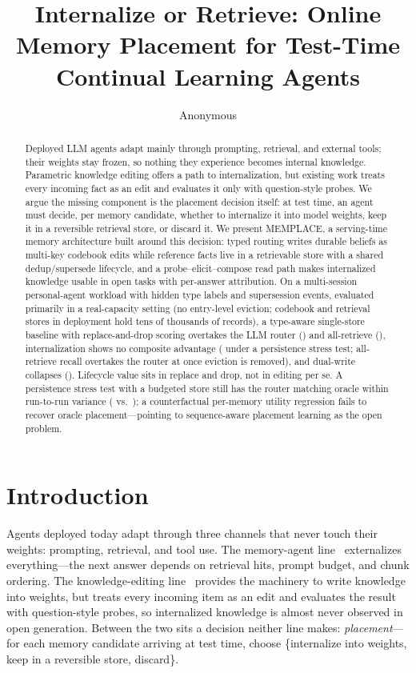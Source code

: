 \documentclass{article}
\title{Internalize or Retrieve: Online Memory Placement for Test-Time Continual Learning Agents}
\author{Anonymous}
\begin{document}
\maketitle

\begin{abstract}
Deployed LLM agents adapt mainly through prompting, retrieval, and external tools; their weights stay frozen, so nothing they experience becomes internal knowledge. Parametric knowledge editing offers a path to internalization, but existing work treats every incoming fact as an edit and evaluates it only with question-style probes. We argue the missing component is the placement decision itself: at test time, an agent must decide, per memory candidate, whether to internalize it into model weights, keep it in a reversible retrieval store, or discard it. We present MEMPLACE, a serving-time memory architecture built around this decision: typed routing writes durable beliefs as multi-key codebook edits while reference facts live in a retrievable store with a shared dedup/supersede lifecycle, and a probe--elicit--compose read path makes internalized knowledge usable in open tasks with per-answer attribution. On a multi-session personal-agent workload with hidden type labels and supersession events, evaluated primarily in a real-capacity setting (no entry-level eviction; codebook and retrieval stores in deployment hold tens of thousands of records), a type-aware single-store baseline with replace-and-drop scoring \SeightOffComp{} overtakes the LLM router (\SfiveOffComp) and all-retrieve (\SoneOffComp), internalization shows no composite advantage (\StwoComp{} under a persistence stress test; all-retrieve recall \SoneOffRecall{} overtakes the router at \SfiveOffRecall{} once eviction is removed), and dual-write collapses (\SsevenComp). Lifecycle value sits in replace and drop, not in editing per se. A persistence stress test with a budgeted store still has the router matching oracle within run-to-run variance (\SfiveComp{} vs.\ \SfourComp); a counterfactual per-memory utility regression fails to recover oracle placement---pointing to sequence-aware placement learning as the open problem.
\end{abstract}

\section{Introduction}
\label{sec:intro}

Agents deployed today adapt through three channels that never touch their weights: prompting, retrieval, and tool use. The memory-agent line~\citep{packer2023memgpt,zhong2024memorybank,chhikara2025mem0} externalizes everything---the next answer depends on retrieval hits, prompt budget, and chunk ordering. The knowledge-editing line~\citep{meng2022rome,meng2023memit,hartvigsen2023grace,horen2026} provides the machinery to write knowledge into weights, but treats every incoming item as an edit and evaluates the result with question-style probes, so internalized knowledge is almost never observed in open generation. Between the two sits a decision neither line makes: \emph{placement}---for each memory candidate arriving at test time, choose \{internalize into weights, keep in a reversible store, discard\}.
\end{document}
